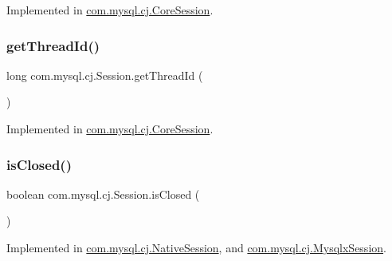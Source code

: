 Implemented in \mbox{\hyperlink{classcom_1_1mysql_1_1cj_1_1_core_session_aebba972c5e1c2f61230c8be4b2819230}{com.\+mysql.\+cj.\+Core\+Session}}.

\mbox{\label{interfacecom_1_1mysql_1_1cj_1_1_session_a01afd0778a66788ef0d93cb9c20baf5a}} 
\subsubsection{\texorpdfstring{get\+Thread\+Id()}{getThreadId()}}
{\footnotesize\ttfamily long com.\+mysql.\+cj.\+Session.\+get\+Thread\+Id (\begin{DoxyParamCaption}{ }\end{DoxyParamCaption})}



Implemented in \mbox{\hyperlink{classcom_1_1mysql_1_1cj_1_1_core_session_ae141e5eacf82d93db417cb2e97acfece}{com.\+mysql.\+cj.\+Core\+Session}}.

\mbox{\label{interfacecom_1_1mysql_1_1cj_1_1_session_a82714d0d3979d474bcafd3884f3ea0de}} 
\subsubsection{\texorpdfstring{is\+Closed()}{isClosed()}}
{\footnotesize\ttfamily boolean com.\+mysql.\+cj.\+Session.\+is\+Closed (\begin{DoxyParamCaption}{ }\end{DoxyParamCaption})}



Implemented in \mbox{\hyperlink{classcom_1_1mysql_1_1cj_1_1_native_session_a41c503c26623fb7da3cd6a8e854247f8}{com.\+mysql.\+cj.\+Native\+Session}}, and \mbox{\hyperlink{classcom_1_1mysql_1_1cj_1_1_mysqlx_session_a1507b9d1e31b712971270eb58a291f3b}{com.\+mysql.\+cj.\+Mysqlx\+Session}}.

\mbox{\label{interfacecom_1_1mysql_1_1cj_1_1_session_a3f747951ef258e5219237177aa3d4311}} 
